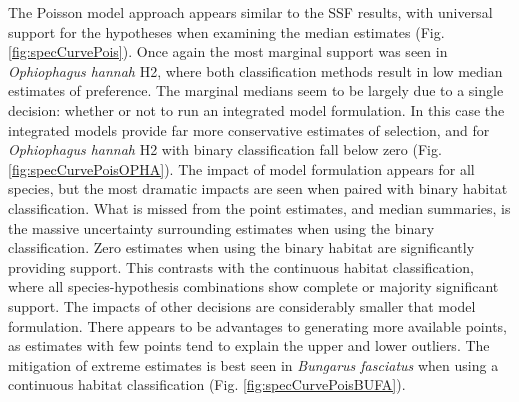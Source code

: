 \documentclass[10pt,a4paper]{article}
\begin{document}
The Poisson model approach appears similar to the SSF results, with universal support for the hypotheses when examining the median estimates (Fig. \ref{fig:specCurvePois}).
Once again the most marginal support was seen in \emph{Ophiophagus hannah} H2, where both classification methods result in low median estimates of preference.
The marginal medians seem to be largely due to a single decision: whether or not to run an integrated model formulation.
In this case the integrated models provide far more conservative estimates of selection, and for \emph{Ophiophagus hannah} H2 with binary classification fall below zero (Fig. \ref{fig:specCurvePoisOPHA}).
The impact of model formulation appears for all species, but the most dramatic impacts are seen when paired with binary habitat classification.
What is missed from the point estimates, and median summaries, is the massive uncertainty surrounding estimates when using the binary classification.
Zero estimates when using the binary habitat are significantly providing support.
This contrasts with the continuous habitat classification, where all species-hypothesis combinations show complete or majority significant support.
The impacts of other decisions are considerably smaller that model formulation.
There appears to be advantages to generating more available points, as estimates with few points tend to explain the upper and lower outliers.
The mitigation of extreme estimates is best seen in \emph{Bungarus fasciatus} when using a continuous habitat classification (Fig. \ref{fig:specCurvePoisBUFA}).
\end{document}
